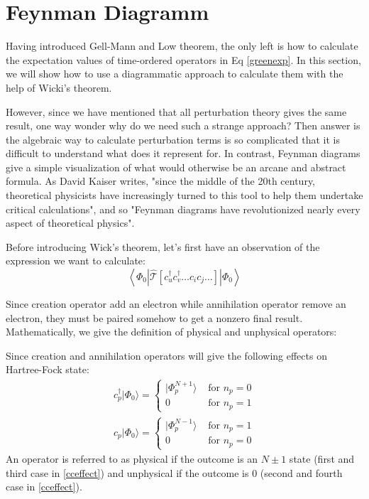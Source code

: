 \section{Feynman Diagramm}

Having introduced Gell-Mann and Low theorem, the only left is how to calculate the expectation values of time-ordered operators in Eq \ref{greenexp}.
In this section, we will show how to use a diagrammatic approach to calculate them with the help of Wicki's theorem.

However, since we have mentioned that all perturbation theory gives the same result, one way wonder why do we need such a strange approach?
Then answer is the algebraic way to calculate perturbation terms is so complicated that it is difficult to understand what does it represent for.
In contrast, Feynman diagrams give a simple visualization of what would otherwise be an arcane and abstract formula.
As David Kaiser writes, "since the middle of the 20th century, theoretical physicists have increasingly turned to this tool to help them undertake critical calculations", and so "Feynman diagrams have revolutionized nearly every aspect of theoretical physics". \cite{kaiser}

Before introducing Wick's theorem, let's first have an observation of the expression we want to calculate:
\begin{equation}
	\left\langle\Phi_{0}\left|
	\hat{\mathcal{T}} \left[ c_u^{\dagger} c_v^{\dagger} \ldots c_i c_j \ldots \right]
	\right| \Phi_{0}\right\rangle
\end{equation}

Since creation operator add an electron while annihilation operator remove an electron, they must be paired somehow to get a nonzero final result.
Mathematically, we give the definition of physical and unphysical operators:

Since creation and annihilation operators will give the following effects on Hartree-Fock state:
\begin{equation} \label{cceffect}
	\begin{aligned}
		c_{p}^{\dagger} | \Phi_{0} \rangle=\left\{\begin{array}{ll}{ | \Phi_{p}^{N+1} \rangle} & {\text { for } n_{p}=0} \\ {0} & {\text { for } n_{p}=1}\end{array}\right.
		\\
		c_{p} | \Phi_{0} \rangle=\left\{\begin{array}{ll}{ | \Phi_{p}^{N-1} \rangle} & {\text { for } n_{p}=1} \\ {0} & {\text { for } n_{p}=0}\end{array}\right.
	\end{aligned}
\end{equation}
An operator is referred to as physical if the outcome is an $N\pm 1$ state (first and third case in \ref{cceffect}) and unphysical if the outcome is 0 (second and fourth case in \ref{cceffect}).

